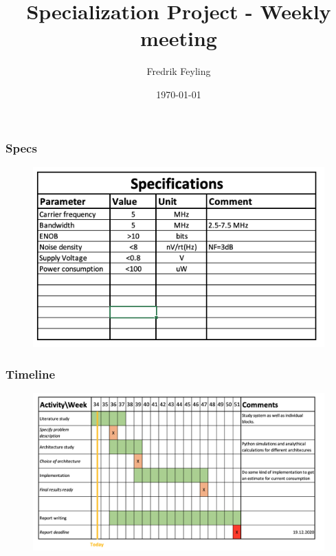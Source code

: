 \documentclass{beamer}
\title{Specialization Project - Weekly meeting}
\author{Fredrik Feyling}
\date{\today}
\begin{document}
\frame{\titlepage}

\begin{frame}
\frametitle{Specs}

\begin{figure}[htbp]
\begin{center}
\includegraphics[width=\linewidth]{specs}
\end{center}
\end{figure}


\end{frame}

\begin{frame}
\frametitle{Timeline}

\begin{figure}[htbp]
\begin{center}
\includegraphics[width=\linewidth]{gantt}
\end{center}
\end{figure}

\end{frame}
\end{document}
